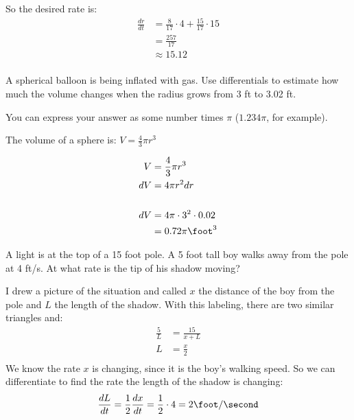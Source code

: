 \documentclass[fleqn,addpoints]{exam}
\begin{document}
\begin{questions}
\begin{solution}[11 cm]

So the desired rate is:
\begin{align*}
  \frac{dr}{dt} &= \frac{8}{17} \cdot 4 + \frac{15}{17} \cdot 15 \\
                &= \frac{257}{17} \\
                &\approx 15.12 \\
\end{align*}

\end{solution}

\ifprintanswers
\pagebreak
\fi

\question[7]
A spherical balloon is being inflated with gas.  Use differentials to estimate how much the volume changes when the
radius grows from 3 ft to 3.02 ft.

You can express your answer as some number times $\pi$ ($1.234 \pi$, for example).

The volume of a sphere is: $V = \frac{4}{3} \pi r^3$

\begin{solution}[3 cm]
\begin{align*}
  V  &= \frac{4}{3} \pi r^3 \\ 
  dV &= 4 \pi r^2 dr \\
  \\
  dV &= 4 \pi \cdot 3^2 \cdot 0.02 \\
     &= 0.72 \pi \foot^3 \\
\end{align*}
\end{solution}

\ifprintanswers
\else
\pagebreak
\fi

\bonusquestion[10] 
A light is at the top of a 15 foot pole.  A 5 foot tall boy walks away from the pole at 4 ft/s.  At what rate is the tip
of his shadow moving?

\begin{solution}[9 cm] 
I drew a picture of the situation and called $x$ the distance of the boy from the pole and $L$ the length of the
shadow.  With this labeling, there are two similar triangles and:
\begin{align*}
  \frac{5}{L} &= \frac{15}{x + L} \\
  L &= \frac{x}{2} \\
\end{align*}
We know the rate $x$ is changing, since it is the boy's walking speed.  So we can differentiate to find the rate the
length of the shadow is changing:
\[
  \frac{dL}{dt} = \frac{1}{2} \frac{dx}{dt} = \frac{1}{2} \cdot 4 = 2 \foot / \second
\]


\end{solution}
\end{questions}
\end{document}
